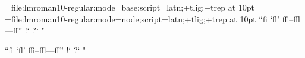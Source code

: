 

\font\testa={file:lmroman10-regular:mode=base;script=latn;+tlig;+trep} at 10pt
\font\testb={file:lmroman10-regular:mode=node;script=latn;+tlig;+trep} at 10pt
\testa ``fi `fl' ffi--ffl---ff'' !` ?` "\par
\testb ``fi `fl' ffi--ffl---ff'' !` ?` "\par
\bye
